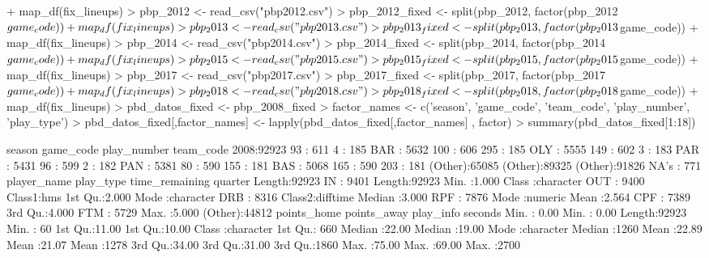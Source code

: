 \documentclass[paper=a4, fontsize=9pt]{article}
\begin{document}
\begin{Schunk}
\begin{Sinput}
+   map_df(fix_lineups) 
> pbp_2012 <- read_csv("pbp2012.csv")
> pbp_2012_fixed <- split(pbp_2012, factor(pbp_2012$game_code)) %
+   map_df(fix_lineups) 
> pbp_2013 <- read_csv("pbp2013.csv")
> pbp_2013_fixed <- split(pbp_2013, factor(pbp_2013$game_code)) %
+   map_df(fix_lineups) 
> pbp_2014 <- read_csv("pbp2014.csv")
> pbp_2014_fixed <- split(pbp_2014, factor(pbp_2014$game_code)) %
+   map_df(fix_lineups) 
> pbp_2015 <- read_csv("pbp2015.csv")
> pbp_2015_fixed <- split(pbp_2015, factor(pbp_2015$game_code)) %
+   map_df(fix_lineups) 
> pbp_2017 <- read_csv("pbp2017.csv")
> pbp_2017_fixed <- split(pbp_2017, factor(pbp_2017$game_code)) %
+   map_df(fix_lineups) 
> pbp_2018 <- read_csv("pbp2018.csv")
> pbp_2018_fixed <- split(pbp_2018, factor(pbp_2018$game_code)) %
+   map_df(fix_lineups) 
> pbd_datos_fixed <- pbp_2008_fixed
> factor_names <- c('season', 'game_code', 'team_code', 'play_number', 'play_type')
> pbd_datos_fixed[,factor_names] <- lapply(pbd_datos_fixed[,factor_names] , factor)
> summary(pbd_datos_fixed[1:18])
\end{Sinput}
\begin{Soutput}
  season        game_code      play_number      team_code    
 2008:92923   93     :  611   4      :  185   BAR    : 5632  
              100    :  606   295    :  185   OLY    : 5555  
              149    :  602   3      :  183   PAR    : 5431  
              96     :  599   2      :  182   PAN    : 5381  
              80     :  590   155    :  181   BAS    : 5068  
              165    :  590   203    :  181   (Other):65085  
              (Other):89325   (Other):91826   NA's   :  771  
 player_name          play_type     time_remaining       quarter     
 Length:92923       IN     : 9401   Length:92923      Min.   :1.000  
 Class :character   OUT    : 9400   Class1:hms        1st Qu.:2.000  
 Mode  :character   DRB    : 8316   Class2:difftime   Median :3.000  
                    RPF    : 7876   Mode  :numeric    Mean   :2.564  
                    CPF    : 7389                     3rd Qu.:4.000  
                    FTM    : 5729                     Max.   :5.000  
                    (Other):44812                                    
  points_home     points_away     play_info            seconds    
 Min.   : 0.00   Min.   : 0.00   Length:92923       Min.   :  60  
 1st Qu.:11.00   1st Qu.:10.00   Class :character   1st Qu.: 660  
 Median :22.00   Median :19.00   Mode  :character   Median :1260  
 Mean   :22.89   Mean   :21.07                      Mean   :1278  
 3rd Qu.:34.00   3rd Qu.:31.00                      3rd Qu.:1860  
 Max.   :75.00   Max.   :69.00                      Max.   :2700  
                                                                  

\end{Soutput}
\end{Schunk}
\end{document}
